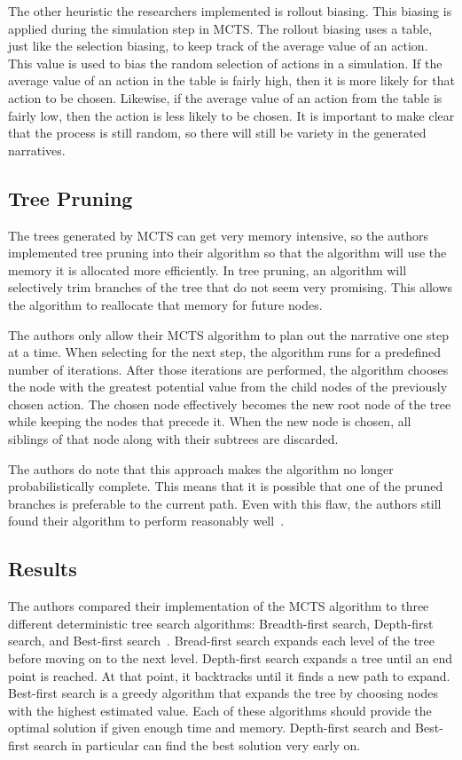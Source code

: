 \documentclass{sig-alternate}
\begin{document}
The other heuristic the researchers implemented is rollout biasing. This biasing is applied during the simulation step in MCTS. The rollout biasing uses a table, just like the selection biasing, to keep track of the average value of an action. This value is used to bias the random selection of actions in a simulation. If the average value of an action in the table is fairly high, then it is more likely for that action to be chosen. Likewise, if the average value of an action from the table is fairly low, then the action is less likely to be chosen. It is important to make clear that the process is still random, so there will still be variety in the generated narratives.

\subsection{Tree Pruning}
The trees generated by MCTS can get very memory intensive, so the authors implemented tree pruning into their algorithm so that the algorithm will use the memory it is allocated more efficiently. In tree pruning, an algorithm will selectively trim branches of the tree that do not seem very promising. This allows the algorithm to reallocate that memory for future nodes. 

The authors only allow their MCTS algorithm to plan out the narrative one step at a time. When selecting for the next step, the algorithm runs for a predefined number of iterations. After those iterations are performed, the algorithm chooses the node with the greatest potential value from the child nodes of the previously chosen action. The chosen node effectively becomes the new root node of the tree while keeping the nodes that precede it. When the new node is chosen, all siblings of that node along with their subtrees are discarded.

The authors do note that this approach makes the algorithm no longer probabilistically complete. This means that it is possible that one of the pruned branches is preferable to the current path. Even with this flaw, the authors still found their algorithm to perform reasonably well~\cite{Narrative}.

\subsection{Results}
The authors compared their implementation of the MCTS algorithm to three different deterministic tree search algorithms: Breadth-first search, Depth-first search, and Best-first search~\cite{Narrative}. Bread-first search expands each level of the tree before moving on to the next level. Depth-first search expands a tree until an end point is reached. At that point, it backtracks until it finds a new path to expand. Best-first search is a greedy algorithm that expands the tree by choosing nodes with the highest estimated value. Each of these algorithms should provide the optimal solution if given enough time and memory. Depth-first search and Best-first search in particular can find the best solution very early on.
\end{document}

